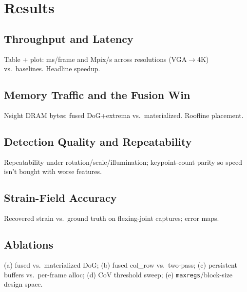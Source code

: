 \section{Results}
\label{sec:results}

\subsection{Throughput and Latency}
\begin{fillbox}
Table + plot: ms/frame and Mpix/s across resolutions (VGA$\rightarrow$4K) vs.\
baselines. Headline speedup.
\end{fillbox}

\subsection{Memory Traffic and the Fusion Win}
\begin{fillbox}
Nsight DRAM bytes: fused DoG+extrema vs.\ materialized. Roofline placement.
\end{fillbox}

\subsection{Detection Quality and Repeatability}
\begin{fillbox}
Repeatability under rotation/scale/illumination; keypoint-count parity so speed
isn't bought with worse features.
\end{fillbox}

\subsection{Strain-Field Accuracy}
\begin{fillbox}
Recovered strain vs.\ ground truth on flexing-joint captures; error maps.
\end{fillbox}

\subsection{Ablations}
\begin{fillbox}
(a) fused vs.\ materialized DoG; (b) fused col\_row vs.\ two-pass;
(c) persistent buffers vs.\ per-frame alloc; (d) CoV threshold sweep;
(e) \texttt{maxregs}/block-size design space.
\end{fillbox}

